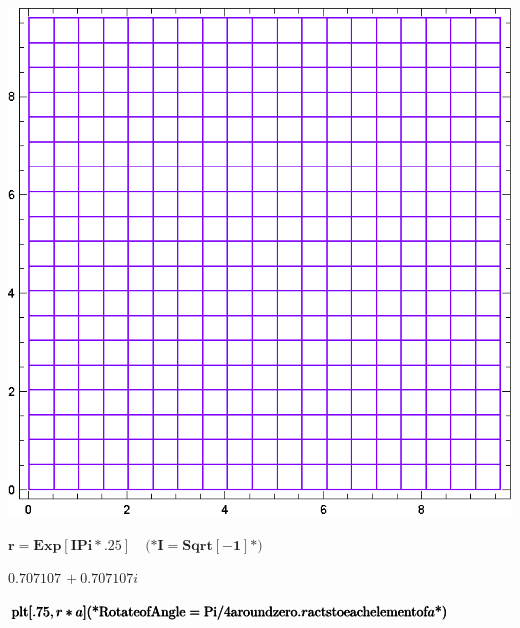 \documentclass{article}
\begin{document}
\includegraphics{functions_on_complex-plane_gr1.eps}

\begin{doublespace}
\noindent\(\pmb{r=\text{Exp}[I \text{Pi}*.25]\quad \text{(*}I=\text{Sqrt}[-1]\text{*)}}\)
\end{doublespace}

\begin{doublespace}
\noindent\(0.707107\, +0.707107 i\)
\end{doublespace}

\begin{doublespace}
\noindent\(\pmb{\text{plt}[.75,r*a]}\\
\pmb{\text{(*}\text{Rotate} \text{of} \text{Angle}=\text{Pi}/4 \text{around} \text{zero}.r \text{acts} \text{to} \text{each} \text{element} \text{of}
a\text{*)}}\)
\end{doublespace}
\end{document}
